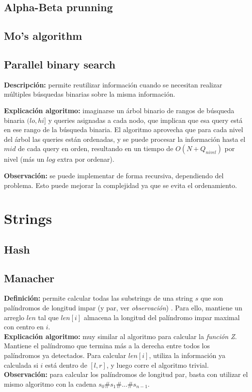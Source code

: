 \subsection{Alpha-Beta prunning}
\subsection{Mo's algorithm}
\subsection{Parallel binary search}
\textbf{Descripción:} permite reutilizar información cuando se necesitan
realizar múltiples búsquedas binarias sobre la misma información.

\textbf{Explicación algoritmo:} imaginarse un árbol binario de rangos de
búsqueda binaria $(lo, hi]$ y queries asignadas a cada nodo, que implican que
esa query está en ese rango de la búsqueda binaria. El algoritmo aprovecha
que para cada nivel del árbol las queries están ordenadas, y se puede procesar
la información hasta el $mid$ de cada query en orden, resultando en un tiempo de
$O(N + Q_{nivel})$ por nivel (más un $log$ extra por ordenar). 

\textbf{Observación: } se puede implementar de forma recursiva, dependiendo del
problema. Esto puede mejorar la complejidad ya que se evita el ordenamiento.

\section{Strings}%
\subsection{Hash}
\subsection{Manacher}
\textbf{Definición: } permite calcular todas las substrings
de una string $s$ que son palíndromos de longitud impar (y par, ver 
\emph{observación}) . Para ello, mantiene un arreglo $len$ tal que $len[i]$ 
almacena la longitud del palíndromo impar maximal con centro en $i$. \\
\textbf{Explicación algoritmo: } muy similar al algoritmo para calcular
la \emph{función Z}. Mantiene el palíndromo que termina más a la derecha
entre todos los palíndromos ya detectados. Para calcular $len[i]$, utiliza
la información ya calculada si $i$ está dentro de $[l, r]$, y luego corre
el algoritmo trivial. \\
\textbf{Observación: } para calcular los palíndromos de longitud par, basta
con utilizar el mismo algoritmo con la cadena $s_0\#s_1\#...\#s_{n-1}$.
